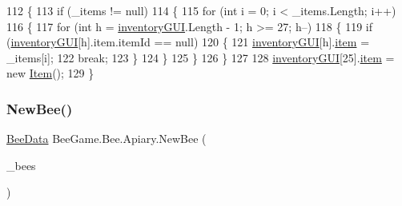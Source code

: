 \begin{DoxyCode}
112         \{
113             \textcolor{keywordflow}{if} (\_items != null)
114             \{
115                 \textcolor{keywordflow}{for} (\textcolor{keywordtype}{int} i = 0; i < \_items.Length; i++)
116                 \{
117                     \textcolor{keywordflow}{for} (\textcolor{keywordtype}{int} h = \hyperlink{class_bee_game_1_1_inventory_1_1_inventory_base_a48dcba7ad7bfa1bed8c9ae290fb32857}{inventoryGUI}.Length - 1; h >= 27; h--)
118                     \{
119                         \textcolor{keywordflow}{if} (\hyperlink{class_bee_game_1_1_inventory_1_1_inventory_base_a48dcba7ad7bfa1bed8c9ae290fb32857}{inventoryGUI}[h].item.itemId == null)
120                         \{
121                             \hyperlink{class_bee_game_1_1_inventory_1_1_inventory_base_a48dcba7ad7bfa1bed8c9ae290fb32857}{inventoryGUI}[h].\hyperlink{class_bee_game_1_1_inventory_1_1_inventory_slot_a31b201e7eef9ed0001a447b3f76a7a81}{item} = \_items[i];
122                             \textcolor{keywordflow}{break};
123                         \}
124                     \}
125                 \}
126             \}
127 
128             \hyperlink{class_bee_game_1_1_inventory_1_1_inventory_base_a48dcba7ad7bfa1bed8c9ae290fb32857}{inventoryGUI}[25].\hyperlink{class_bee_game_1_1_inventory_1_1_inventory_slot_a31b201e7eef9ed0001a447b3f76a7a81}{item} = \textcolor{keyword}{new} \hyperlink{struct_bee_game_1_1_items_1_1_item}{Item}();
129         \}
\end{DoxyCode}
\mbox{\label{class_bee_game_1_1_bee_1_1_apiary_ae3a597a3e45de14511f10d17bd5d539b}} 
\subsubsection{\texorpdfstring{New\+Bee()}{NewBee()}}
{\footnotesize\ttfamily \hyperlink{struct_bee_game_1_1_bee_1_1_bee_data}{Bee\+Data} Bee\+Game.\+Bee.\+Apiary.\+New\+Bee (\begin{DoxyParamCaption}\item[{\hyperlink{struct_bee_game_1_1_bee_1_1_bee_data}{Bee\+Data} \mbox{[}$\,$\mbox{]}}]{\+\_\+bees }\end{DoxyParamCaption})\hspace{0.3cm}{\ttfamily [private]}}



